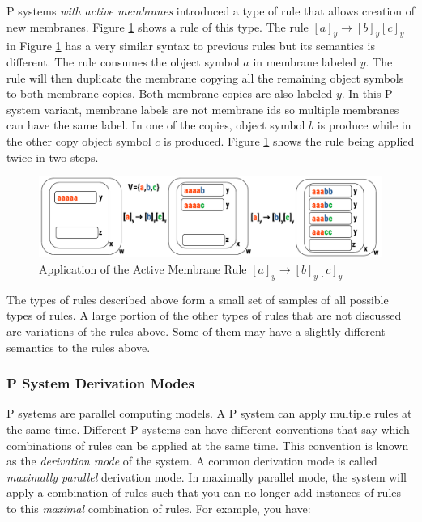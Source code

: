 \documentclass{article}
\begin{document}
P systems \textit{with active membranes} introduced a type of rule that allows creation of new
membranes. Figure \ref{fig:active-mem-rule} shows a rule of this type. The rule $[a]_y \rightarrow
[b]_y[c]_y$ in Figure \ref{fig:active-mem-rule} has a very similar syntax to previous rules but its
semantics is different. The rule consumes the object symbol $a$ in membrane labeled $y$. The rule 
will then duplicate the membrane copying all the remaining object symbols to both membrane copies.
Both membrane copies are also labeled $y$. In this P system variant, membrane labels are not
membrane ids so multiple membranes can have the same label. In one of the copies, object symbol 
$b$ is produce while in the other copy object symbol $c$ is produced. Figure
\ref{fig:active-mem-rule} shows the rule being applied twice in two steps.

\begin{figure}[H]
\begin{center}
\includegraphics[scale=0.55]{figures/zzz-active-mem-rule.pdf}
\caption{Application of the Active Membrane Rule $[a]_y \rightarrow [b]_y[c]_y$}
\label{fig:active-mem-rule}
\end{center}
\end{figure}

The types of rules described above form a small set of samples of all possible types of rules. A 
large portion of the other types of rules that are not discussed are variations of the rules 
above. Some of them may have a slightly different semantics to the rules above.


\subsubsection{P System Derivation Modes}\label{s-derivation}

P systems are parallel computing models. A P system can apply multiple rules at the same time.
Different P systems can have different conventions that say which combinations of rules can be 
applied at the same time. This convention is known as the \textit{derivation mode} of the system.
A common derivation mode is called \textit{maximally parallel} derivation mode. In maximally
parallel mode, the system will apply a combination of rules such that you can no longer add 
instances of rules to this \textit{maximal} combination of rules. For example, you have:
\end{document}

